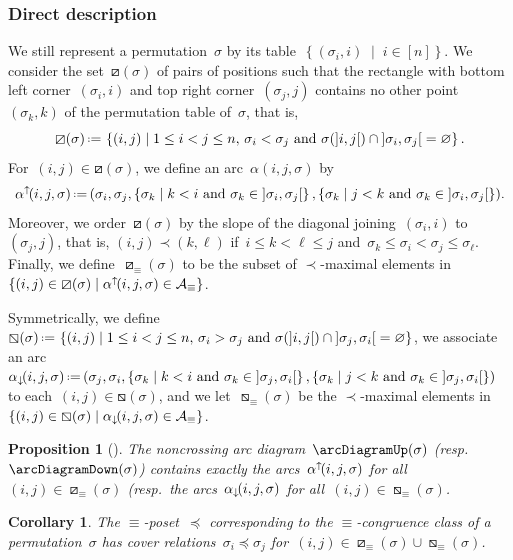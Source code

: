 \documentclass{amsart}
\newtheorem{corollary}[theorem]{Corollary}
\newtheorem{proposition}[theorem]{Proposition}
\theoremstyle{definition}
\newcommand{\set}[2]{\left\{ #1 \;\middle|\; #2 \right\}} %
\newcommand{\eqdef}{\mbox{\,\raisebox{0.2ex}{\scriptsize\ensuremath{\mathrm:}}\ensuremath{=}\,}} %
\newcommand{\arcs}{{\mathcal{A}}} %
\newcommand{\arcDown}{\smash{\alpha_{\downarrow\!}}} %
\newcommand{\arcUp}{\smash{\alpha^{\uparrow\!}}} %
\begin{document}
\subsubsection{Direct description}

We still represent a permutation~$\sigma$ by its table~$\set{(\sigma_i, i)}{i \in [n]}$.
We consider the set~$\boxslash(\sigma)$ of pairs of positions such that the rectangle with bottom left corner~$(\sigma_i, i)$ and top right corner~$(\sigma_j, j)$ contains no other point~$(\sigma_k, k)$ of the permutation table of~$\sigma$, that is,
\[
\boxslash(\sigma) \eqdef \set{(i, j)}{1 \le i < j \le n, \, \sigma_i < \sigma_j \text{ and } \sigma({]i,j[}) \cap {]\sigma_i, \sigma_j[} = \varnothing}.
\]
For~$(i, j) \in \boxslash(\sigma)$, we define an arc~$\alpha(i, j, \sigma)$ by
\[
\arcUp(i, j, \sigma) \eqdef (\sigma_i, \sigma_j, \set{\sigma_k}{k < i \text{ and } \sigma_k \in {]\sigma_i, \sigma_j[}}, \set{\sigma_k}{j < k \text{ and } \sigma_k \in {]\sigma_i, \sigma_j[}}).
\]
Moreover, we order~$\boxslash(\sigma)$ by the slope of the diagonal joining~$(\sigma_i, i)$ to~$(\sigma_j, j)$, that is, $(i, j) \prec (k,\ell)$ if~$i \le k < \ell \le j$ and~$\sigma_k \le \sigma_i < \sigma_j \le \sigma_\ell$.
Finally, we define~$\boxslash_\equiv(\sigma)$ to be the subset of $\prec$-maximal elements in~$\set{(i, j) \in \boxslash(\sigma)}{\arcUp(i, j, \sigma) \in \arcs_\equiv}$.

Symmetrically, we define~$\boxbslash(\sigma) \eqdef \set{(i, j)}{1 \le i < j \le n, \, \sigma_i > \sigma_j \text{ and } \sigma({]i,j[}) \cap {]\sigma_j, \sigma_i[} = \varnothing}$, we associate an arc~$\arcDown(i, j, \sigma) \eqdef (\sigma_j, \sigma_i, \set{\sigma_k}{k < i \text{ and } \sigma_k \in {]\sigma_j, \sigma_i[}}, \set{\sigma_k}{j < k \text{ and } \sigma_k \in {]\sigma_j, \sigma_i[}})$ to each~${(i,j) \in \boxbslash(\sigma)}$, and we let~$\boxbslash_\equiv(\sigma)$ be the $\prec$-maximal elements in~$\set{(i, j) \in \boxbslash(\sigma)}{\arcDown(i, j, \sigma) \in \arcs_\equiv}$.

\begin{proposition}[{\cite[Sect.~2.4]{Pilaud-arcDiagramAlgebra}}]
\label{prop:insertionMap}
The noncrossing arc diagram~$\arcDiagramUp(\sigma)$ (resp.~$\arcDiagramDown(\sigma)$) contains exactly the arcs~$\arcUp(i,j,\sigma)$ for all~$(i,j) \in \boxslash_\equiv(\sigma)$ (resp.~the arcs~$\arcDown(i,j,\sigma)$ for all~$(i,j) \in \boxbslash_\equiv(\sigma)$.
\end{proposition}

\begin{corollary}
\label{coro:insertionMap}
The $\equiv$-poset~$\preccurlyeq$ corresponding to the $\equiv$-congruence class of a permutation~$\sigma$ has cover relations~$\sigma_i \preccurlyeq \sigma_j$ for~$(i,j) \in \boxslash_\equiv(\sigma) \cup \boxbslash_\equiv(\sigma)$.
\end{corollary}
\end{document}
